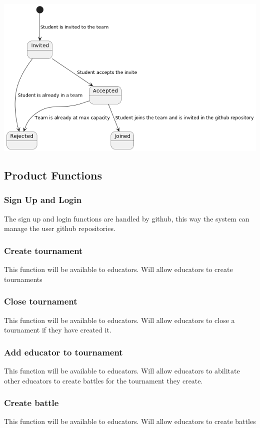 \documentclass{article}
\begin{document}
\begin{center}
    \includegraphics[width=0.8\linewidth]{image15.png}
  \label{fig:manageinvites}
\end{center}
\subsection{Product Functions}
\subsubsection{Sign Up and Login}
The sign up and login functions are handled by github, this way the system can manage the user github repositories.
\subsubsection{Create tournament}
This function will be available to educators.
Will allow educators to create tournaments
\subsubsection{Close tournament}
This function will be available to educators.
Will allow educators to close a tournament if they have created it.
\subsubsection{Add educator to tournament}
This function will be available to educators.
Will allow educators to abilitate other educators to create battles for the tournament they create.
\subsubsection{Create battle}
This function will be available to educators.
Will allow educators to create battles
\end{document}
